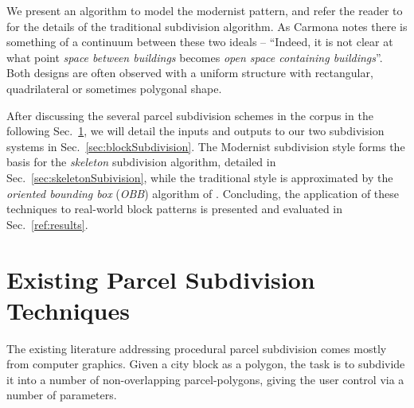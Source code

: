 We present an algorithm to model the modernist pattern, and refer the reader to \cite{twak12} for the details of the traditional subdivision algorithm. As Carmona notes there is something of a continuum between these two ideals -- ``Indeed, it is not clear at what point \emph{space between buildings} becomes \emph{open space containing buildings}''. Both designs are often observed with a uniform structure with rectangular, quadrilateral or sometimes polygonal shape\cite{curdes1997stadtstruktur}.
\kawt

After discussing the several parcel subdivision schemes in the corpus in the following Sec.~\ref{sec:parcelPrevious}, we will detail the inputs and outputs to our two subdivision systems in Sec.~\ref{sec:blockSubdivision}. The Modernist subdivision style forms the basis for the \emph{skeleton} subdivision algorithm, detailed in Sec.~\ref{sec:skeletonSubivision}, while the traditional style is approximated by the \emph{oriented bounding box} (\emph{OBB}) algorithm of \cite{twak12}.
Concluding, the application of these techniques to real-world block patterns is presented and evaluated in Sec.~\ref{ref:results}.



\section{Existing Parcel Subdivision Techniques}
\label{sec:parcelPrevious}

The existing literature addressing procedural parcel subdivision comes mostly from computer graphics. Given a city block as a polygon, the task is to subdivide it into a number of non-overlapping parcel-polygons, giving the user control via a number of parameters.

